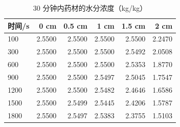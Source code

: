 \begin{table}[H]
  \centering
  \caption{30 分钟内药材的水分浓度（kg/kg）}
  \label{tab:p1C}
  \footnotesize
  \begin{tabular}{@{}lrrrrr@{}}
    \toprule
    时间/s & 0 cm & 0.5 cm & 1 cm & 1.5 cm & 2 cm \\
    \midrule
    100 & 2.5500 & 2.5500 & 2.5500 & 2.5500 & 2.2470 \\
    300 & 2.5500 & 2.5500 & 2.5500 & 2.5492 & 2.0508 \\
    600 & 2.5500 & 2.5500 & 2.5500 & 2.5353 & 1.8770 \\
    900 & 2.5500 & 2.5500 & 2.5497 & 2.5045 & 1.7547 \\
    1200 & 2.5500 & 2.5500 & 2.5482 & 2.4646 & 1.6586 \\
    1500 & 2.5500 & 2.5499 & 2.5445 & 2.4206 & 1.5787 \\
    1800 & 2.5500 & 2.5497 & 2.5383 & 2.3755 & 1.5103 \\
    \bottomrule
  \end{tabular}
\end{table}
